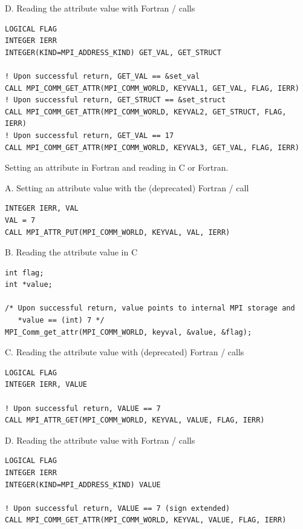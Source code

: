 \begin{example}
D. Reading the attribute value with Fortran \MPIII/ calls

\begin{lstlisting}[language={[MPI]Fortran}]
LOGICAL FLAG
INTEGER IERR
INTEGER(KIND=MPI_ADDRESS_KIND) GET_VAL, GET_STRUCT

! Upon successful return, GET_VAL == &set_val
CALL MPI_COMM_GET_ATTR(MPI_COMM_WORLD, KEYVAL1, GET_VAL, FLAG, IERR)
! Upon successful return, GET_STRUCT == &set_struct
CALL MPI_COMM_GET_ATTR(MPI_COMM_WORLD, KEYVAL2, GET_STRUCT, FLAG, IERR)
! Upon successful return, GET_VAL == 17
CALL MPI_COMM_GET_ATTR(MPI_COMM_WORLD, KEYVAL3, GET_VAL, FLAG, IERR)
\end{lstlisting}
\end{example}

\begin{example}
\label{exa:misc-attr:f-old}%
Setting an attribute in Fortran and reading in C or Fortran.
%

A. Setting an attribute value with the (deprecated) Fortran \MPII/ call

\begin{lstlisting}[language={[MPI]Fortran}]
INTEGER IERR, VAL
VAL = 7
CALL MPI_ATTR_PUT(MPI_COMM_WORLD, KEYVAL, VAL, IERR)
\end{lstlisting}

B. Reading the attribute value in C

\begin{lstlisting}[language={[MPI]C}]
int flag;
int *value;

/* Upon successful return, value points to internal MPI storage and
   *value == (int) 7 */
MPI_Comm_get_attr(MPI_COMM_WORLD, keyval, &value, &flag);
\end{lstlisting}

C. Reading the attribute value with (deprecated) Fortran \MPII/ calls

\begin{lstlisting}[language={[MPI]Fortran}]
LOGICAL FLAG
INTEGER IERR, VALUE

! Upon successful return, VALUE == 7
CALL MPI_ATTR_GET(MPI_COMM_WORLD, KEYVAL, VALUE, FLAG, IERR)
\end{lstlisting}

D. Reading the attribute value with Fortran \MPIII/ calls

\begin{lstlisting}[language={[MPI]Fortran}]
LOGICAL FLAG
INTEGER IERR
INTEGER(KIND=MPI_ADDRESS_KIND) VALUE

! Upon successful return, VALUE == 7 (sign extended)
CALL MPI_COMM_GET_ATTR(MPI_COMM_WORLD, KEYVAL, VALUE, FLAG, IERR)
\end{lstlisting}
\end{example}

